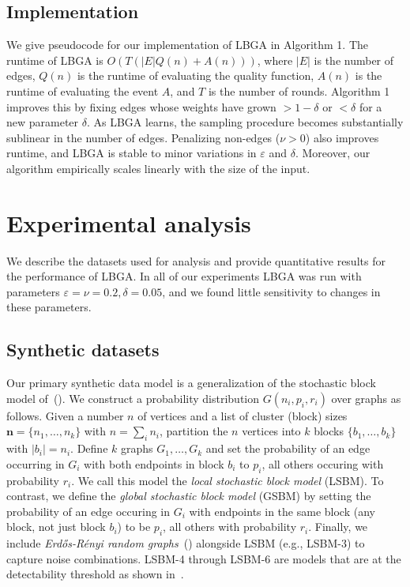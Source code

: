 \documentclass{article}
\newcommand{\er}{Erd\H{o}s-R\'{e}nyi }
\begin{document}
\subsection{Implementation}\label{sec:impl}

We give pseudocode for our implementation of LBGA in Algorithm 1.  The runtime
of LBGA is $O(T(|E| Q(n) + A(n)))$, where $|E|$ is the number of edges, $Q(n)$
is the runtime of evaluating the quality function, $A(n)$ is the runtime of
evaluating the event $A$, and $T$ is the number of rounds.  Algorithm 1
improves this by fixing edges whose weights have grown $ > 1-\delta$ or $<
\delta$ for a new parameter $\delta$. As LBGA learns, the sampling procedure
becomes substantially sublinear in the number of edges.  Penalizing non-edges
($\nu > 0$) also improves runtime, and LBGA is stable to minor variations in
$\varepsilon$ and $\delta$. Moreover, our algorithm empirically scales linearly
with the size of the input.


\section{Experimental analysis}
\label{sec:experiments}
We describe the datasets used for analysis and provide quantitative results for
the performance of LBGA. In all of our experiments LBGA was run with parameters
$\varepsilon=\nu=0.2, \delta=0.05$, and we found little sensitivity to changes
in these parameters.

\subsection{Synthetic datasets}
\label{sec:synthetic-model}

Our primary synthetic data model is a generalization of the stochastic block
model of~(\cite{Wang87}). We construct a probability distribution $G(n_i, p_i,
r_i)$ over graphs as follows. Given a number $n$ of vertices and a list of
cluster (block) sizes $\mathbf{n}=\{n_1, \dots, n_k\}$ with $n=\sum_i n_i$,
partition the $n$ vertices into $k$ blocks $\{b_1, \dots, b_k\}$ with
$|b_i|=n_i$. Define $k$ graphs $G_1, \dots, G_k$ and set the probability
of an edge occurring in $G_i$ with both endpoints in block $b_i$ to $p_i$, all
others occuring with probability $r_i$. We call this model the \emph{local
stochastic block model} (LSBM). To contrast, we define the \emph{global
stochastic block model} (GSBM) by setting the probability of an edge occuring
in $G_i$ with endpoints in the same block (any block, not just block $b_i$) to
be $p_i$, all others with probability $r_i$. Finally, we include \emph{\er
random graphs}~(\cite{Erdos60}) alongside LSBM (e.g., LSBM-3) to capture noise
combinations. LSBM-4 through LSBM-6 are models that are at the detectability
threshold as shown in~\cite{DecelleKMZ11}. 
\end{document}
